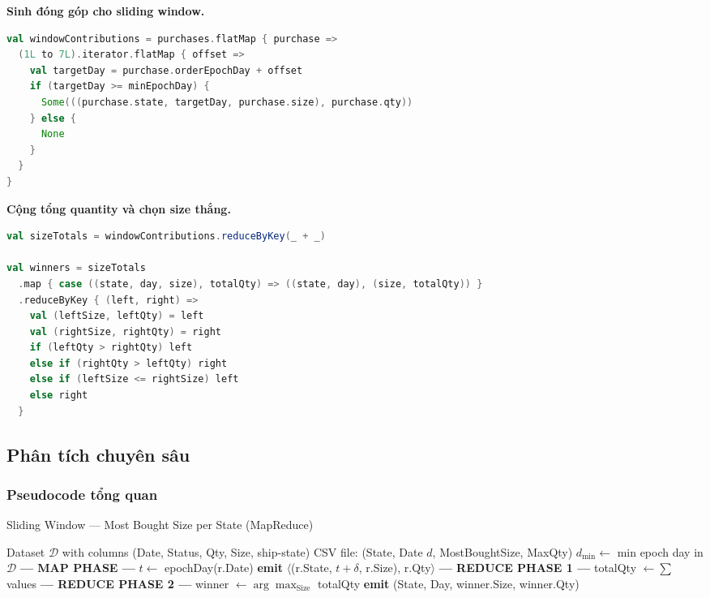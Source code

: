 \textbf{Sinh đóng góp cho sliding window.}
\begin{lstlisting}[language=Scala]
val windowContributions = purchases.flatMap { purchase =>
  (1L to 7L).iterator.flatMap { offset =>
    val targetDay = purchase.orderEpochDay + offset
    if (targetDay >= minEpochDay) {
      Some(((purchase.state, targetDay, purchase.size), purchase.qty))
    } else {
      None
    }
  }
}
\end{lstlisting}

\textbf{Cộng tổng quantity và chọn size thắng.}
\begin{lstlisting}[language=Scala]
val sizeTotals = windowContributions.reduceByKey(_ + _)

val winners = sizeTotals
  .map { case ((state, day, size), totalQty) => ((state, day), (size, totalQty)) }
  .reduceByKey { (left, right) =>
    val (leftSize, leftQty) = left
    val (rightSize, rightQty) = right
    if (leftQty > rightQty) left
    else if (rightQty > leftQty) right
    else if (leftSize <= rightSize) left
    else right
  }
\end{lstlisting}

\subsection{Phân tích chuyên sâu}

\subsubsection{Pseudocode tổng quan}

\begin{algorithm}[H]
\caption{Sliding Window --- Most Bought Size per State (MapReduce)}
\label{alg:task1_1}
\begin{algorithmic}[1]
\Require Dataset $\mathcal{D}$ with columns (Date, Status, Qty, Size, ship-state)
\Ensure CSV file: (State, Date $d$, MostBoughtSize, MaxQty)
\Statex
\State $d_{\min} \gets$ min epoch day in $\mathcal{D}$
\Statex
\Statex \textbf{--- MAP PHASE ---}
    \State $t \gets$ epochDay(r.Date)
            \State \textbf{emit} $\langle$(r.State, $t + \delta$, r.Size), r.Qty$\rangle$
        \EndIf
    \EndFor
\EndFor
\Statex
\Statex \textbf{--- REDUCE PHASE 1 ---}
    \State totalQty $\gets \sum$ values 
\EndFor
\Statex
\Statex \textbf{--- REDUCE PHASE 2 ---}
    \State winner $\gets \arg\max_{\text{Size}}$ totalQty 
    \State \textbf{emit} (State, Day, winner.Size, winner.Qty)
\EndFor
\end{algorithmic}
\end{algorithm}

